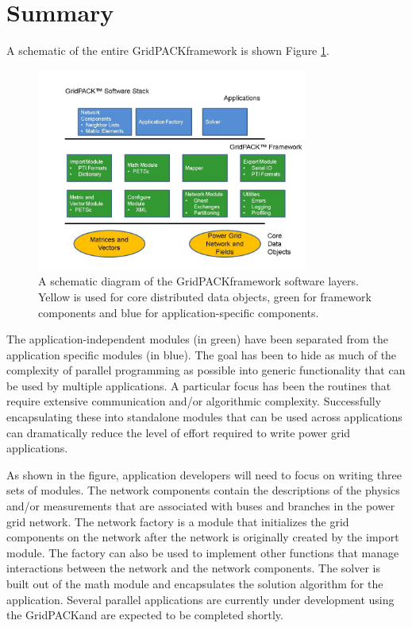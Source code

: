 \documentclass{acm_proc_article-sp}
\begin{document}
\section{Summary}
A schematic of the entire GridPACK\texttrademark framework is shown Figure
\ref{stack}.
\begin{figure}
\centering
\includegraphics[width=3.5in,keepaspectratio=true]{./Fig1}
\caption{\label{stack} A schematic diagram of the GridPACK\texttrademark framework
software layers.
Yellow is used for core distributed data objects, green for framework components
and blue for application-specific components.}
\end{figure}
The application-independent modules (in green) have been separated from
the application specific modules (in blue). The goal has been to
hide as much of the complexity of parallel programming as possible into
generic functionality
that can be used by multiple applications. A particular focus has been
the routines that require extensive communication and/or algorithmic
complexity. Successfully encapsulating these into standalone
modules that can be used across applications can dramatically reduce the
level of effort required to write power grid applications.

As shown in the figure, application developers will need to focus on
writing three sets of modules. The network components
contain the descriptions of the physics and/or
measurements that are associated with buses and branches in the power grid
network. The network factory is a module that initializes the grid components
on the network after the network is originally created by the import module. The
factory can also be used to implement other functions that manage interactions
between the network and the network components.  The solver is built out of
the math module and encapsulates the solution algorithm for the application.
Several parallel applications are currently under development using the
GridPACK\texttrademark and are expected to be completed shortly.
\end{document}
